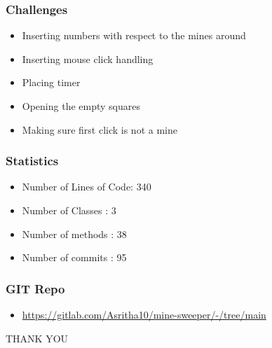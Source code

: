 \documentclass[14pt]{beamer}
\begin{document}
    \begin{frame}
	\frametitle{Challenges}
        \begin{itemize}
	     \item Inserting numbers with respect to the mines around
	     \item Inserting mouse click handling
	     \item Placing timer
	     \item Opening the empty squares
	     \item Making sure first click is not a mine
        \end{itemize}
    \end{frame}
    \begin{frame}
	\frametitle{Statistics}
        \begin{itemize}
	     \item Number of Lines of Code: 340
	     \item Number of Classes : 3
	     \item Number of methods : 38
	     \item Number of commits : 95
        \end{itemize}
    \end{frame}
  \begin{frame}
	\frametitle{GIT Repo}
	\begin{itemize}
		\item \url{https://gitlab.com/Asritha10/mine-sweeper/-/tree/main} 
	\end{itemize}
    \end{frame}
    \begin{frame}
	\begin{center}
	     THANK YOU
	\end{center}
    \end{frame}
\end{document}
